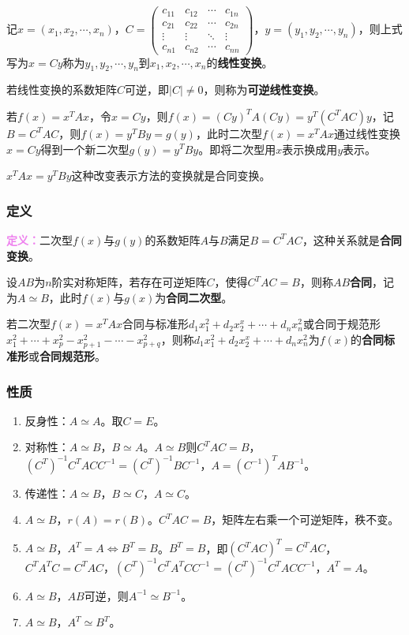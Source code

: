 记$x=(x_1,x_2,\cdots,x_n)$，$C=\left(\begin{array}{cccc}
    c_{11} & c_{12} & \cdots & c_{1n} \\
    c_{21} & c_{22} & \cdots & c_{2n} \\
    \vdots & \vdots & \ddots & \vdots \\
    c_{n1} & c_{n2} & \cdots & c_{nn}
\end{array}\right)$，$y=(y_1,y_2,\cdots,y_n)$，则上式写为$x=Cy$称为$y_1,y_2,\cdots,y_n$到$x_1,x_2,\cdots,x_n$的\textbf{线性变换}。

若线性变换的系数矩阵$C$可逆，即$\vert C\vert\neq0$，则称为\textbf{可逆线性变换}。

若$f(x)=x^TAx$，令$x=Cy$，则$f(x)=(Cy)^TA(Cy)=y^T(C^TAC)y$，记$B=C^TAC$，则$f(x)=y^TBy=g(y)$，此时二次型$f(x)=x^TAx$通过线性变换$x=Cy$得到一个新二次型$g(y)=y^TBy$。即将二次型用$x$表示换成用$y$表示。

$x^TAx=y^TBy$这种改变表示方法的变换就是合同变换。

\subsubsection{定义}

\textcolor{violet}{\textbf{定义：}}二次型$f(x)$与$g(y)$的系数矩阵$A$与$B$满足$B=C^TAC$，这种关系就是\textbf{合同变换}。

设$AB$为$n$阶实对称矩阵，若存在可逆矩阵$C$，使得$C^TAC=B$，则称$AB$\textbf{合同}，记为$A\simeq B$，此时$f(x)$与$g(x)$为\textbf{合同二次型}。

若二次型$f(x)=x^TAx$合同与标准形$d_1x_1^2+d_2x_2^x+\cdots+d_nx_n^2$或合同于规范形$x_1^2+\cdots+x_p^2-x_{p+1}^2-\cdots-x_{p+q}^2$，则称$d_1x_1^2+d_2x_2^x+\cdots+d_nx_n^2$为$f(x)$的\textbf{合同标准形}或\textbf{合同规范形}。

\subsubsection{性质}

\begin{enumerate}
    \item 反身性：$A\simeq A$。取$C=E$。
    \item 对称性：$A\simeq B$，$B\simeq A$。$A\simeq B$则$C^TAC=B$，$(C^T)^{-1}C^TACC^{-1}=(C^T)^{-1}BC^{-1}$，$A=(C^{-1})^TAB^{-1}$。
    \item 传递性：$A\simeq B$，$B\simeq C$，$A\simeq C$。
    \item $A\simeq B$，$r(A)=r(B)$。$C^TAC=B$，矩阵左右乘一个可逆矩阵，秩不变。
    \item $A\simeq B$，$A^T=A\Leftrightarrow B^T=B$。$B^T=B$，即$(C^TAC)^T=C^TAC$，$C^TA^TC=C^TAC$，$(C^T)^{-1}C^TA^TCC^{-1}=(C^T)^{-1}C^TACC^{-1}$，$A^T=A$。
    \item $A\simeq B$，$AB$可逆，则$A^{-1}\simeq B^{-1}$。
    \item $A\simeq B$，$A^T\simeq B^T$。
\end{enumerate}

